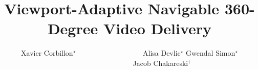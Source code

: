 \documentclass[t,12pt,pdftex, aspectratio=1610]{beamer}
\title[Viewport-Adaptive Navigable 360-Degree Video Delivery]{\Large
Viewport-Adaptive Navigable 360-Degree Video Delivery\newline}
\author[Xavier Corbillon et al.]{\hspace{-2.5pt}Xavier
Corbillon$^{\star}$ \hfill ~~~~~~~~~~~~~~~~~~Alisa Devlic$^{\star}$
\newline Gwendal Simon$^{\star}$ \hfill ~~~~~~~~~~~~~~~~~~Jacob Chakareski$^{\dagger}$}
\date{}
\begin{document}
	
	


\inserttitlepage


\newcommand\insertTableOfContents{

\begin{frame}[c,noframenumbering]
	\frametitle{Table of contents}
	\tableofcontents[hideallsubsections]
\end{frame}
}

\newcommand\defineContentTable{
    \AtBeginSection[] {
     \begin{frame}[c,noframenumbering]
     \frametitle{Table of contents}
       \small \tableofcontents[hideallsubsections,sectionstyle=show/shaded,subsectionstyle=hide/hide/hide ]
     \end{frame}
    }
}






%
%
%
\end{document}
